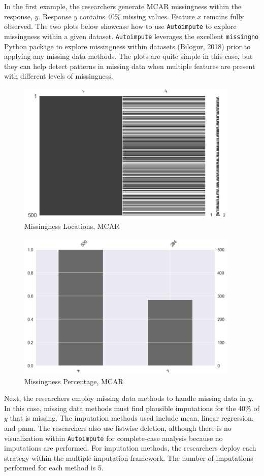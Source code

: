 \documentclass[12pt,oneside]{chicagocapstone}
\begin{document}
In the first example, the researchers generate MCAR missingness within
the response, \(y\). Response \(y\) contains 40\% missing values.
Feature \(x\) remains fully observed. The two plots below showcase how
to use \texttt{Autoimpute} to explore missingness within a given
dataset. \texttt{Autoimpute} leverages the excellent \texttt{missingno}
Python package to explore missingness within datasets (Bilogur, 2018)
prior to applying any missing data methods. The plots are quite simple
in this case, but they can help detect patterns in missing data when
multiple features are present with different levels of missingness.
\begin{figure}

{\centering \includegraphics[width=400px]{figure/y-mis-forty-loc} 

}

\caption{Missingness Locations, MCAR}\label{fig:y-mis-forty-loc}
\end{figure}
\begin{figure}

{\centering \includegraphics[width=400px]{figure/y-mis-forty-bar} 

}

\caption{Missingness Percentage, MCAR}\label{fig:y-mis-forty-bar}
\end{figure}
Next, the researchers employ missing data methods to handle missing data
in \(y\). In this case, missing data methods must find plausible
imputations for the 40\% of \(y\) that is missing. The imputation
methods used include mean, linear regression, and pmm. The researchers
also use listwise deletion, although there is no visualization within
\texttt{Autoimpute} for complete-case analysis because no imputations
are performed. For imputation methods, the researchers deploy each
strategy within the multiple imputation framework. The number of
imputations performed for each method is 5.
\end{document}
